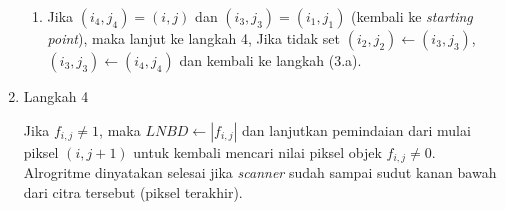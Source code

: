 \begin{enumerate}
\begin{enumerate}
            \item Jika  $(i_4, j_4) = (i, j)$ dan $(i_3, j_3) = (i_1, j_1)$ (kembali ke \textit{starting point}), maka lanjut ke langkah 4, Jika tidak set $(i_2, j_2) \leftarrow (i_3, j_3)$, $(i_3, j_3) \leftarrow (i_4, j_4)$ dan kembali ke langkah (3.a).
        \end{enumerate}
        
        \item Langkah 4
        
        Jika $f_{i, j} \neq 1$, maka $LNBD \leftarrow |f_{i, j}|$ dan lanjutkan pemindaian dari mulai piksel $(i, j+1)$ untuk kembali mencari nilai piksel objek $f_{i, j} \neq 0$. Alrogritme dinyatakan selesai jika \textit{scanner} sudah sampai sudut kanan bawah dari citra  tersebut (piksel terakhir).
        

\end{enumerate}

